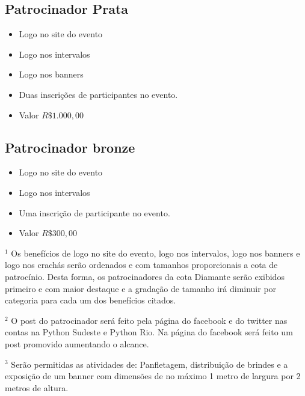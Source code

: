 \documentclass[12pt]{article}
\begin{document}
\subsection{Patrocinador Prata}
    \begin{itemize}[label={}]
    \setlength\itemsep{0.0em}
        \item Logo no site do evento
        \item Logo nos intervalos
        \item Logo nos banners
        \item Duas inscrições de participantes no evento.
        \item Valor $R\$ 1.000,00$
    \end{itemize}
\subsection{Patrocinador bronze}
    \begin{itemize}[label={}]
    \setlength\itemsep{0.0em}
        \item Logo no site do evento
        \item Logo nos intervalos
        \item Uma inscrição de participante no evento.
        \item Valor $R\$ 300,00$
    \end{itemize}

$^1$ Os benefícios de logo no site do evento, logo nos intervalos, logo nos banners e logo nos crachás serão ordenados e com tamanhos proporcionais a cota de patrocínio. Desta forma, os patrocinadores da cota Diamante serão exibidos primeiro e com maior destaque e a gradação de tamanho irá diminuir por categoria para cada um dos benefícios citados.

$^2$ O post do patrocinador será feito pela página do facebook e do twitter nas contas na Python Sudeste e Python Rio. Na página do facebook será feito um post promovido aumentando o alcance.

$^3$ Serão permitidas as atividades de: Panfletagem, distribuição de brindes e a exposição de um  banner com dimensões de no máximo 1 metro de largura por 2 metros de  altura.
\end{document}
